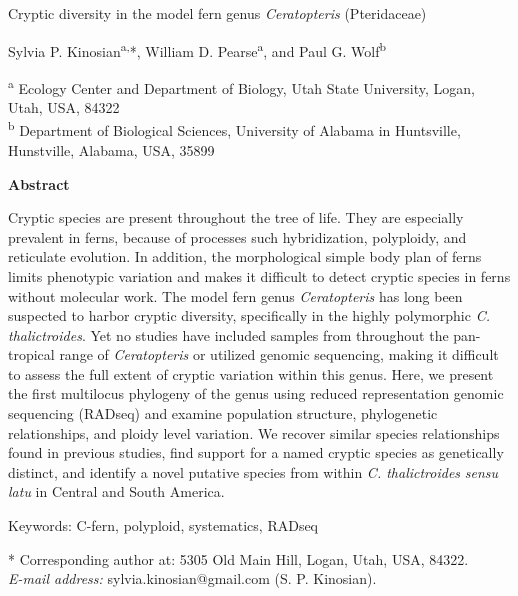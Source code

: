 \documentclass[12pt]{article}
\begin{document}
\begin{flushleft}
{\large{Cryptic diversity in the model fern genus \textit{Ceratopteris} (Pteridaceae)}}

Sylvia P. Kinosian\textsuperscript{a,}*, William D. Pearse\textsuperscript{a}, and Paul G. Wolf\textsuperscript{b}

{\small{\textsuperscript{a} Ecology Center and Department of Biology, Utah State University, Logan, Utah, USA, 84322\\
\textsuperscript{b} Department of Biological Sciences, University of Alabama in Huntsville, Hunstville, Alabama, USA, 35899}}

\textbf{Abstract}

Cryptic species are present throughout the tree of life. They are especially prevalent in ferns, because of processes such hybridization, polyploidy, and reticulate evolution. In addition, the morphological simple body plan of ferns limits phenotypic variation and makes it difficult to detect cryptic species in ferns without molecular work. The model fern genus \textit{Ceratopteris} has long been suspected to harbor cryptic diversity, specifically in the highly polymorphic \textit{C. thalictroides}. Yet no studies have included samples from throughout the pan-tropical range of \textit{Ceratopteris} or utilized genomic sequencing, making it difficult to assess the full extent of cryptic variation within this genus. Here, we present the first multilocus phylogeny of the genus using reduced representation genomic sequencing (RADseq) and examine population structure, phylogenetic relationships, and ploidy level variation. We recover similar species relationships found in previous studies, find support for a named cryptic species as genetically distinct, and identify a novel putative species from within \textit{C. thalictroides} \textit{sensu latu} in Central and South America.

Keywords: C-fern, polyploid, systematics, RADseq

* Corresponding author at: 5305 Old Main Hill, Logan, Utah, USA, 84322. \\ \textit{E-mail address:} sylvia.kinosian@gmail.com (S. P. Kinosian).

\setlength{\parindent}{5ex}

\vspace{30cm}
\end{flushleft}
\end{document}

